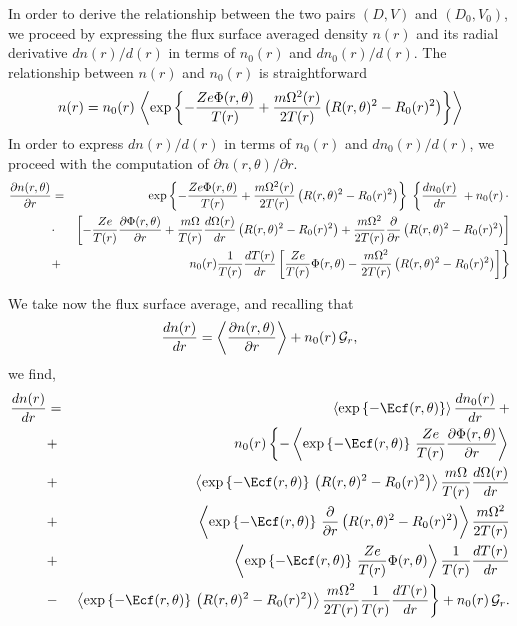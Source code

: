 In order to derive the relationship between the two pairs
$(D,V)$ and $(D_0,V_0)$, we proceed by expressing the
flux surface averaged density $n(r)$ and its radial
derivative $d n(r)/d(r)$ in terms of $n_0(r)$ and 
$d n_0(r)/d(r)$.
The relationship between $n(r)$ and $n_0(r)$ is straightforward
\[ n(r) = n_0(r) \, \left \langle \exp\left\{-\frac{Ze\Phi(r,\theta)}{T(r)} +\frac{m \Omega^2(r)}{2T(r)} \left(R(r,\theta)^2 - R_0(r)^2\right)\right\} \right \rangle \]
In order to express $d n(r)/d(r)$ in terms of $n_0(r)$ and 
$d n_0(r)/d(r)$, we proceed with the computation of 
$ \partial n(r,\theta) / \partial r$.
\begin{eqnarray}
\frac{\partial n(r,\theta)} {\partial r} &=& \exp\left\{-\frac{Ze\Phi(r,\theta)}{T(r)} +\frac{m \Omega^2(r)}{2T(r)} \left(R(r,\theta)^2 - R_0(r)^2\right)\right\} \; \left\{ \frac{d n_0(r)} {d r} \; + {n_0(r)} \, \cdot \right. \nonumber \\
& \cdot & \left[-\frac{Ze}{T(r)} \frac{\partial \Phi(r,\theta)} {\partial r} + \frac{m\Omega}{T(r)} \frac{d \Omega(r)}{d r} \left(R(r,\theta)^2 - R_0(r)^2\right) + \frac{m\Omega^2}{2T(r)}\frac{\partial}{\partial r} \left(R(r,\theta)^2 - R_0(r)^2\right) \right]
\nonumber \\
& + & \left. n_0(r) \frac{1}{T(r)} \frac{d T(r)} {d r} \left[\frac{Ze}{T(r)} \Phi(r,\theta) - \frac{m\Omega^2}{2T(r)} \left(R(r,\theta)^2 - R_0(r)^2\right) \right] \right\}
\label{eq.nderiv}
\end{eqnarray}

We take now the flux surface average, and recalling
that
\[
\frac{d n(r)}{d r} = \left \langle { \frac{ \partial n(r,\theta)}{\partial r}} \right \rangle + n_0(r)\,{\cal G}_r,
\]
we find, 
\begin{eqnarray*}
\nder &=& \left \langle \expargs \right \rangle \noder \,+\\
& + & n_0(r) \left\{ - \left \langle \expargs \, \frac{Ze}{T(r)} \Pparder \right \rangle \right. \\
& + & \left \langle \expargs \, \Rsqdiff \right \rangle \frac{m\Omega}{T(r)} \frac{d \Omega(r)}{d r}\\
& + & \left \langle \expargs \, \frac{\partial}{\partial r} \Rsqdiff \right \rangle \frac{m\Omega^2}{2T(r)}\\
& + & \left \langle \expargs \, \frac{Ze}{T(r)} \Phi(r,\theta) \right \rangle
\Tlnder \\
& - & \left. \left \langle \expargs \, \Rsqdiff \right \rangle \frac{m\Omega^2}{2T(r)} \Tlnder
\right\}
+ n_0(r)\,\calGr.
\end{eqnarray*}

